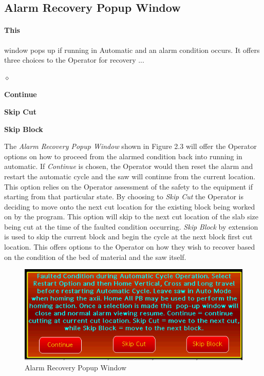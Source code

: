 \subsection{Alarm Recovery Popup Window} \paragraph*{This}window pops up if running in Automatic and an alarm condition occurs. It offers three choices to the Operator for recovery ... 
\begin{list}{$\diamond$}{}
	\item \textbf{Continue}
	\item \textbf{Skip Cut}
	\item \textbf{Skip Block}
\end{list}
The \textit{Alarm Recovery Popup Window} shown in Figure 2.3 will offer the Operator options on how to proceed from the alarmed condition back into running in automatic. If \textit{Continue} is chosen, the Operator would then reset the alarm and restart the automatic cycle and the saw will continue from the current location. This option relies on the Operator assessment of the safety to the equipment if starting from that particular state. By choosing to \textit{Skip Cut} the Operator is deciding to move onto the next cut location for the existing block being worked on by the program. This option will skip to the next cut location of the slab size being cut at the time of the faulted condition occurring. \textit{Skip Block} by extension is used to skip the current block and begin the cycle at the next block first cut location. This offers options to the Operator on how they wish to recover based on the condition of the bed of material and the saw itself.
\begin{figure}
	\centering
	\includegraphics[width=.5\linewidth]{screen-captures/alarms/alarms-recovery}
	\caption{Alarm Recovery Popup Window}
	\label{fig:alarm-recovery}
\end{figure}
